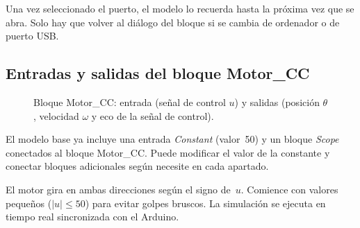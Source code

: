\documentclass[12pt,a4paper]{article}
\begin{document}
\begin{notabox}
  Una vez seleccionado el puerto, el modelo lo recuerda hasta la próxima vez
  que se abra. Solo hay que volver al diálogo del bloque si se cambia de
  ordenador o de puerto USB.
\end{notabox}

\subsection{Entradas y salidas del bloque Motor\_CC}

\begin{figure}[H]
\centering
{}
\caption{Bloque Motor\_CC: entrada (señal de control $u$) y salidas (posición $\theta$,
velocidad $\omega$ y eco de la señal de control).}
\label{fig:motor_cc_block}
\end{figure}

El modelo base ya incluye una entrada \emph{Constant} (valor~50) y un bloque
\emph{Scope} conectados al bloque Motor\_CC. Puede modificar el valor de la
constante y conectar bloques adicionales según necesite en cada apartado.

\begin{notabox}
  El motor gira en ambas direcciones según el signo de~$u$.
  Comience con valores pequeños ($|u|\leq 50$) para evitar golpes bruscos.
  La simulación se ejecuta en tiempo real sincronizada con el Arduino.
\end{notabox}
\end{document}
